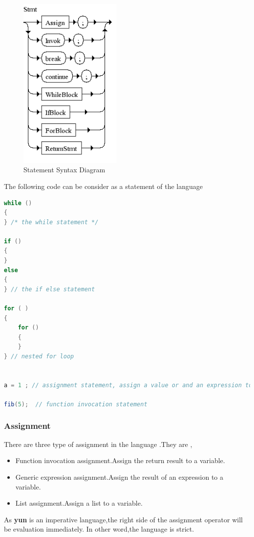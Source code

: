 \begin{figure}[h!]
  \centering
	\includegraphics[width=0.45\textwidth]{pic/c4/stmt.png}
	\caption{Statement Syntax Diagram}
\end{figure}

The following code can be consider as a statement of the language
\begin{lstlisting}[language=java]
while ()
{
} /* the while statement */

if ()
{
}
else
{
} // the if else statement

for ( )
{
	for ()
	{
	}
} // nested for loop 


a = 1 ; // assignment statement, assign a value or and an expression to a variable

fib(5);  // function invocation statement


\end{lstlisting}

\subsubsection{Assignment}
There are three type of assignment in the language .They are ,
\begin{itemize}
\item Function invocation assignment.Assign the return result to a variable.
\item Generic expression assignment.Assign the result of an expression to a variable.
\item List assignment.Assign a list to a variable.
\end{itemize}
As \textbf{yun} is an imperative language,the right side of the assignment operator will be evaluation immediately. In other word,the language is strict.



